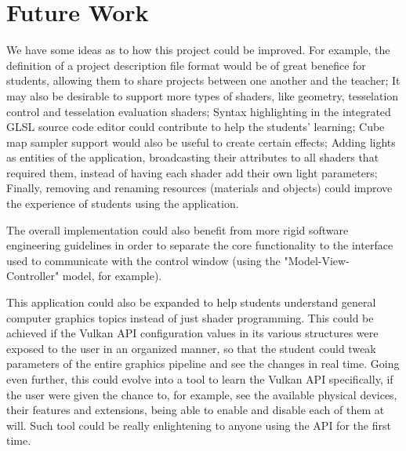 \chapter{Future Work}
We have some ideas as to how this project could be improved. For example, the definition of a project description file format would be of great benefice for students, allowing them to share projects between one another and the teacher; It may also be desirable to support more types of shaders, like geometry, tesselation control and tesselation evaluation shaders; Syntax highlighting in the integrated GLSL source code editor could contribute to help the students' learning;  Cube map sampler support would also be useful to create certain effects; Adding lights as entities of the application, broadcasting their attributes to all shaders that required them, instead of having each shader add their own light parameters; Finally, removing and renaming resources (materials and objects) could improve the experience of students using the application.

The overall implementation could also benefit from more rigid software engineering guidelines in order to separate the core functionality to the interface used to communicate with the control window (using the "Model-View-Controller" model, for example).

This application could also be expanded to help students understand general computer graphics topics instead of just shader programming. This could be achieved if the Vulkan API configuration values in its various structures were exposed to the user in an organized manner, so that the student could tweak parameters of the entire graphics pipeline and see the changes in real time. Going even further, this could evolve into a tool to learn the Vulkan API specifically, if the user were given the chance to, for example, see the available physical devices, their features and extensions, being able to enable and disable each of them at will. Such tool could be really enlightening to anyone using the API for the first time.
